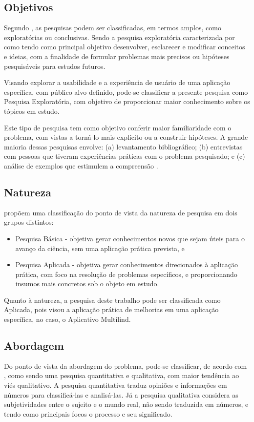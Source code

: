 \subsection{Objetivos}
\label{sec:Objetivos2}
Segundo , as pesquisas podem ser classificadas, em termos amplos, como exploratórias ou conclusivas. Sendo a pesquisa exploratória caracterizada por  como tendo como principal objetivo 
desenvolver, esclarecer e modificar conceitos e ideias, com a finalidade de formular problemas mais precisos ou hipóteses pesquisáveis para estudos futuros.

Visando explorar a usabilidade e a experiência de usuário de uma aplicação específica, com público alvo definido, pode-se classificar a presente pesquisa como Pesquisa Exploratória, com objetivo de proporcionar maior conhecimento 
sobre os tópicos em estudo.

Este tipo de pesquisa tem como objetivo conferir maior familiaridade com o problema, com vistas a torná-lo mais explícito ou a construir hipóteses. A grande maioria dessas pesquisas envolve: (a) levantamento 
bibliográfico; (b) 	entrevistas com pessoas que tiveram experiências práticas com o problema pesquisado; e (c) análise de exemplos que estimulem a compreensão \cite{gil2002}.

\subsection{Natureza}
\label{sec:Natureza}
 propõem uma classificação do ponto de vista da natureza de pesquisa em dois grupos distintos:

\begin{itemize}
	\item Pesquisa Básica - objetiva gerar conhecimentos novos que sejam úteis para o avanço da ciência, sem uma aplicação prática prevista, e
	\item Pesquisa Aplicada - objetiva gerar conhecimentos direcionados à aplicação prática, com foco na resolução de problemas específicos, e 
	proporcionando insumos mais concretos sob o objeto em estudo.
\end{itemize}

Quanto à natureza, a pesquisa deste trabalho pode ser classificada como Aplicada, pois visou a aplicação prática de melhorias em uma aplicação específica, no caso, o Aplicativo Multilind.

\subsection{Abordagem}
\label{sec:Abordagem}
Do ponto de vista da abordagem do problema, pode-se classificar, de acordo com , como sendo uma pesquisa quantitativa e qualitativa, com maior tendência ao viés qualitativo. A pesquisa quantitativa traduz opiniões e informações em 
números para classificá-las e analisá-las. Já a pesquisa qualitativa considera as subjetividades entre o sujeito e o mundo real, não sendo traduzida em números, e tendo como principais focos o processo e seu significado.

